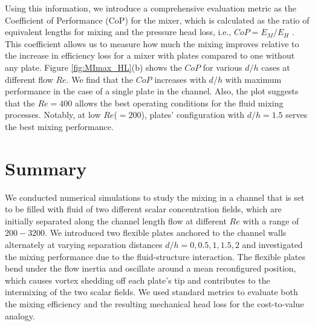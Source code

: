 \documentclass[reprint,a4paper,fleqn]{cas-dc} %
\begin{document}
		Using this information, we introduce a comprehensive evaluation metric as the Coefficient of Performance (CoP) for the mixer, which is calculated as the ratio of equivalent lengths for mixing and the pressure head loss, i.e., $CoP = E_M/E_H$ \citep{Aaron2019, Self2024}. This coefficient allows us to measure how much the mixing improves relative to the increase in efficiency loss for a mixer with plates compared to one without any plate. Figure \ref{fig:MImax_HL}(b) shows the $CoP$ for various $d/h$ cases at different flow $Re$. We find that the $CoP$ increases with $d/h$ with maximum performance in the case of a single plate in the channel. Also, the plot suggests that the $Re=400$ allows the best operating conditions for the fluid mixing processes. Notably, at low $Re$($=200$), plates' configuration with $d/h=1.5$ serves the best mixing performance.
		
		
		
		\section{Summary}
		
		We conducted numerical simulations to study the mixing in a channel that is set to be filled with fluid of two different scalar concentration fields, which are initially separated along the channel length flow at different $Re$ with a range of $200-3200$. We introduced two flexible plates anchored to the channel walls alternately at varying separation distances $d/h=0,0.5,1,1.5,2$ and investigated the mixing performance due to the fluid-structure interaction. The flexible plates bend under the flow inertia and oscillate around a mean reconfigured position, which causes vortex shedding off each plate's tip and contributes to the intermixing of the two scalar fields. We used standard metrics to evaluate both the mixing efficiency and the resulting mechanical head loss for the cost-to-value analogy.
		
\end{document}
